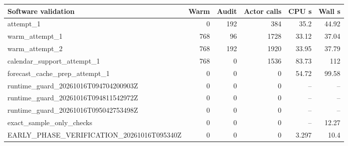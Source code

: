 \begin{tabular}{lrrrrr}
\toprule
Software validation & Warm & Audit & Actor calls & CPU s & Wall s \\
\midrule
attempt\_1 & 0 & 192 & 384 & 35.2 & 44.92 \\
warm\_attempt\_1 & 768 & 96 & 1728 & 33.12 & 37.04 \\
warm\_attempt\_2 & 768 & 192 & 1920 & 33.95 & 37.79 \\
calendar\_support\_attempt\_1 & 768 & 0 & 1536 & 83.73 & 112 \\
forecast\_cache\_prep\_attempt\_1 & 0 & 0 & 0 & 54.72 & 99.58 \\
runtime\_guard\_20261016T094704200903Z & 0 & 0 & 0 & -- & -- \\
runtime\_guard\_20261016T094811542972Z & 0 & 0 & 0 & -- & -- \\
runtime\_guard\_20261016T095042753498Z & 0 & 0 & 0 & -- & -- \\
exact\_sample\_only\_checks & 0 & 0 & 0 & -- & 12.27 \\
EARLY\_PHASE\_VERIFICATION\_20261016T095340Z & 0 & 0 & 0 & 3.297 & 10.4 \\
\bottomrule
\end{tabular}
